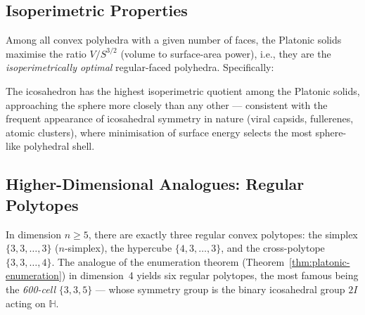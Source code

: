 \subsection{Isoperimetric Properties}
\label{sec:isoperimetric}

Among all convex polyhedra with a given number of faces, the Platonic solids
maximise the ratio $V/S^{3/2}$ (volume to surface-area power), i.e., they are
the \emph{isoperimetrically optimal} regular-faced polyhedra.  Specifically:

\begin{table}[ht]
\centering
\caption{Isoperimetric quotient $36\pi V^2/S^3$ of the Platonic solids
         (sphere has value 1).}
\label{tab:isoperimetric}
\end{table}

The icosahedron has the highest isoperimetric quotient among the Platonic solids,
approaching the sphere more closely than any other — consistent with the
frequent appearance of icosahedral symmetry in nature (viral capsids, fullerenes,
atomic clusters), where minimisation of surface energy selects the
most sphere-like polyhedral shell.

\subsection{Higher-Dimensional Analogues: Regular Polytopes}
\label{sec:higher-dim}

In dimension $n \geq 5$, there are exactly three regular convex polytopes:
the simplex $\{3,3,\ldots,3\}$ ($n$-simplex), the hypercube
$\{4,3,\ldots,3\}$, and the cross-polytope $\{3,3,\ldots,4\}$.  The analogue
of the enumeration theorem (Theorem~\ref{thm:platonic-enumeration}) in
dimension~4 yields six regular polytopes, the most famous being the
\emph{600-cell} $\{3,3,5\}$ — whose symmetry group is the binary icosahedral
group $2I$ acting on $\mathbb{H}$.


